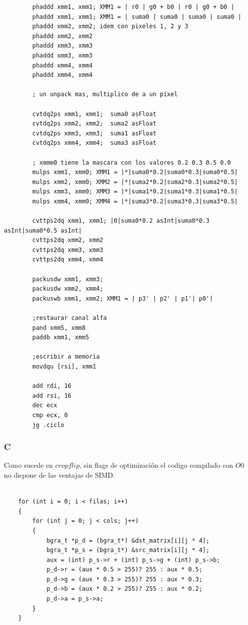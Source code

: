 \begin{codesnippet}
\begin{verbatim}
		phaddd xmm1, xmm1; XMM1 = | r0 | g0 + b0 | r0 | g0 + b0 |
		phaddd xmm1, xmm1; XMM1 = | suma0 | suma0 | suma0 | suma0 | 
		phaddd xmm2, xmm2; idem con pixeles 1, 2 y 3
		phaddd xmm2, xmm2
		phaddd xmm3, xmm3 
		phaddd xmm3, xmm3
		phaddd xmm4, xmm4
		phaddd xmm4, xmm4

		; un unpack mas, multiplico de a un pixel

		cvtdq2ps xmm1, xmm1;  suma0 asFloat
		cvtdq2ps xmm2, xmm2;  suma2 asFloat
		cvtdq2ps xmm3, xmm3;  suma1 asFloat
		cvtdq2ps xmm4, xmm4;  suma3 asFloat

		; xmmm0 tiene la mascara con los valores 0.2 0.3 0.5 0.0
		mulps xmm1, xmm0; XMM1 = |*|suma0*0.2|suma0*0.3|suma0*0.5|  
		mulps xmm2, xmm0; XMM2 = |*|suma2*0.2|suma2*0.3|suma2*0.5|  
		mulps xmm3, xmm0; XMM3 = |*|suma1*0.2|suma1*0.3|suma1*0.5|   
		mulps xmm4, xmm0; XMM4 = |*|suma3*0.2|suma3*0.3|suma3*0.5|   

		cvttps2dq xmm1, xmm1; |0|suma0*0.2 asInt|suma0*0.3 asInt|suma0*0.5 asInt|
		cvttps2dq xmm2, xmm2
		cvttps2dq xmm3, xmm3
		cvttps2dq xmm4, xmm4

		packusdw xmm1, xmm3; 
		packusdw xmm2, xmm4;
		packuswb xmm1, xmm2; XMM1 = | p3' | p2' | p1'| p0'|

		;restaurar canal alfa
		pand xmm5, xmm8
		paddb xmm1, xmm5

		;escribir a memoria
		movdqu [rsi], xmm1

		add rdi, 16	
		add rsi, 16
		dec ecx
		cmp ecx, 0
		jg .ciclo
\end{verbatim}
\end{codesnippet}

\subsubsection{C}

Como sucede en $cropflip$, sin flags de optimización el codigo compilado con $O0$ no dispone de las ventajas de SIMD.

\begin{codesnippet}
\begin{verbatim}

    for (int i = 0; i < filas; i++)
    {
        for (int j = 0; j < cols; j++)
        {
            bgra_t *p_d = (bgra_t*) &dst_matrix[i][j * 4];
            bgra_t *p_s = (bgra_t*) &src_matrix[i][j * 4];
            aux = (int) p_s->r + (int) p_s->g + (int) p_s->b;
            p_d->r = (aux * 0.5 > 255)? 255 : aux * 0.5;
            p_d->g = (aux * 0.3 > 255)? 255 : aux * 0.3;
            p_d->b = (aux * 0.2 > 255)? 255 : aux * 0.2;
            p_d->a = p_s->a;
        }
    }

\end{verbatim}
\end{codesnippet}


